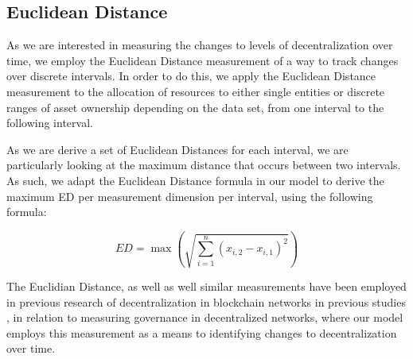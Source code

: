 \documentclass[conference]{IEEEtran}
\begin{document}
\subsection{Euclidean Distance}

As we are interested in measuring the changes to levels of decentralization over time, we employ the Euclidean Distance measurement of a way to track changes over discrete intervals.  In order to do this, we apply the Euclidean Distance measurement to the allocation of resources to either single entities or discrete ranges of asset ownership depending on the data set, from one interval to the following interval.

As we are derive a set of Euclidean Distances for each interval, we are particularly looking at the maximum distance that occurs between two intervals.  As such, we adapt the Euclidean Distance formula in our model to derive the maximum ED per measurement dimension per interval, using the following formula:

\[ED = \max \left( \sqrt{\sum_{i=1}^{n} (x_{i,2} - x_{i,1})^2} \right)
\]

The Euclidian Distance, as well as well similar measurements have been employed in previous research of decentralization in blockchain networks in previous studies \cite{gochhayat2020measuring}, in relation to measuring governance in decentralized networks, where our model employs this measurement as a means to identifying changes to decentralization over time.

\vspace{12pt}

\printbibliography
\end{document}
